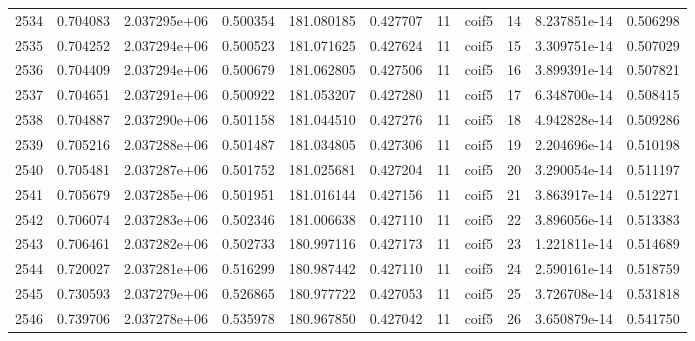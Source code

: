 \begin{tabular}{lrrrrrrlrrr}
2534 &    0.704083 &        2.037295e+06 &  0.500354 &              181.080185 &    0.427707 &      11 &        coif5 &     14 &   8.237851e-14 &      0.506298 \\
2535 &    0.704252 &        2.037294e+06 &  0.500523 &              181.071625 &    0.427624 &      11 &        coif5 &     15 &   3.309751e-14 &      0.507029 \\
2536 &    0.704409 &        2.037294e+06 &  0.500679 &              181.062805 &    0.427506 &      11 &        coif5 &     16 &   3.899391e-14 &      0.507821 \\
2537 &    0.704651 &        2.037291e+06 &  0.500922 &              181.053207 &    0.427280 &      11 &        coif5 &     17 &   6.348700e-14 &      0.508415 \\
2538 &    0.704887 &        2.037290e+06 &  0.501158 &              181.044510 &    0.427276 &      11 &        coif5 &     18 &   4.942828e-14 &      0.509286 \\
2539 &    0.705216 &        2.037288e+06 &  0.501487 &              181.034805 &    0.427306 &      11 &        coif5 &     19 &   2.204696e-14 &      0.510198 \\
2540 &    0.705481 &        2.037287e+06 &  0.501752 &              181.025681 &    0.427204 &      11 &        coif5 &     20 &   3.290054e-14 &      0.511197 \\
2541 &    0.705679 &        2.037285e+06 &  0.501951 &              181.016144 &    0.427156 &      11 &        coif5 &     21 &   3.863917e-14 &      0.512271 \\
2542 &    0.706074 &        2.037283e+06 &  0.502346 &              181.006638 &    0.427110 &      11 &        coif5 &     22 &   3.896056e-14 &      0.513383 \\
2543 &    0.706461 &        2.037282e+06 &  0.502733 &              180.997116 &    0.427173 &      11 &        coif5 &     23 &   1.221811e-14 &      0.514689 \\
2544 &    0.720027 &        2.037281e+06 &  0.516299 &              180.987442 &    0.427110 &      11 &        coif5 &     24 &   2.590161e-14 &      0.518759 \\
2545 &    0.730593 &        2.037279e+06 &  0.526865 &              180.977722 &    0.427053 &      11 &        coif5 &     25 &   3.726708e-14 &      0.531818 \\
2546 &    0.739706 &        2.037278e+06 &  0.535978 &              180.967850 &    0.427042 &      11 &        coif5 &     26 &   3.650879e-14 &      0.541750 \\

\end{tabular}
